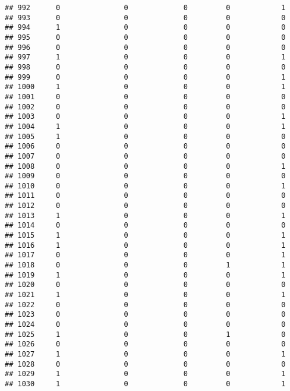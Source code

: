 \documentclass[]{article}
\begin{document}
\begin{verbatim}
## 992      0               0             0         0            1
## 993      0               0             0         0            0
## 994      1               0             0         0            0
## 995      0               0             0         0            0
## 996      0               0             0         0            0
## 997      1               0             0         0            1
## 998      0               0             0         0            0
## 999      0               0             0         0            1
## 1000     1               0             0         0            1
## 1001     0               0             0         0            0
## 1002     0               0             0         0            0
## 1003     0               0             0         0            1
## 1004     1               0             0         0            1
## 1005     1               0             0         0            0
## 1006     0               0             0         0            0
## 1007     0               0             0         0            0
## 1008     0               0             0         0            1
## 1009     0               0             0         0            0
## 1010     0               0             0         0            1
## 1011     0               0             0         0            0
## 1012     0               0             0         0            0
## 1013     1               0             0         0            1
## 1014     0               0             0         0            0
## 1015     1               0             0         0            1
## 1016     1               0             0         0            1
## 1017     0               0             0         0            1
## 1018     0               0             0         1            1
## 1019     1               0             0         0            1
## 1020     0               0             0         0            0
## 1021     1               0             0         0            1
## 1022     0               0             0         0            0
## 1023     0               0             0         0            0
## 1024     0               0             0         0            0
## 1025     1               0             0         1            0
## 1026     0               0             0         0            0
## 1027     1               0             0         0            1
## 1028     0               0             0         0            0
## 1029     1               0             0         0            1
## 1030     1               0             0         0            1

\end{verbatim}
\end{document}
